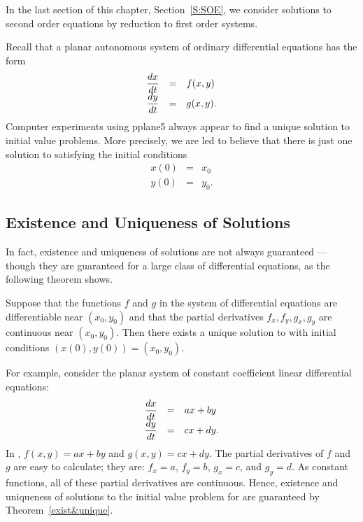 In the last section of this chapter, Section~\ref{S:SOE}, we consider
solutions to second order equations by reduction to first order systems.


 
\label{S:6.1}

Recall that a planar autonomous  system of
ordinary differential equations has the form
\arraystart
\begin{equation}  \label{2dsystem}
\begin{array}{ccl}
\displaystyle \frac{dx}{dt}  & = & f(x,y) \\
\displaystyle \frac{dy}{dt}  & = & g(x,y).
\end{array}
\end{equation}
\arrayfinish
Computer experiments using {\sf pplane5} always appear to find a unique
solution to initial value problems.  More precisely, we are led to
believe that there is just one solution to  satisfying
the initial conditions
\begin{eqnarray*}
x(0) & = & x_0 \\
y(0) & = & y_0.
\end{eqnarray*}

\subsection*{Existence and Uniqueness of Solutions}

In fact, existence  and uniqueness
of solutions  are not always guaranteed
--- though they are guaranteed for a large class of differential
equations, as the following theorem shows.

\begin{thm}  \label{exist&unique}
Suppose that the functions $f$ and $g$ in the system of
differential equations  are differentiable near
$(x_0,y_0)$ and that the partial derivatives $f_x,f_y,g_x,g_y$
are continuous near $(x_0,y_0)$.  Then there exists a unique
solution to  with initial conditions
$(x(0),y(0))=(x_0,y_0)$.
\end{thm} 

For example, consider the planar system of constant coefficient linear
differential equations:
\arraystart
\begin{equation}  \label{2dlinsystem}
\begin{array}{ccl}
\displaystyle \frac{dx}{dt}  & = & ax+by \\
\displaystyle \frac{dy}{dt}  & = & cx+dy.
\end{array}
\end{equation}
\arrayfinish
In , $f(x,y)=ax+by$ and $g(x,y)=cx+dy$.  The partial
derivatives of $f$ and $g$ are easy to calculate; they are: $f_x=a$, $f_y=b$,
$g_x=c$, and $g_y=d$.  As constant functions, all of these partial
derivatives are continuous.  Hence, existence and uniqueness of solutions to
the initial value problem for  are guaranteed by
Theorem~\ref{exist&unique}.


